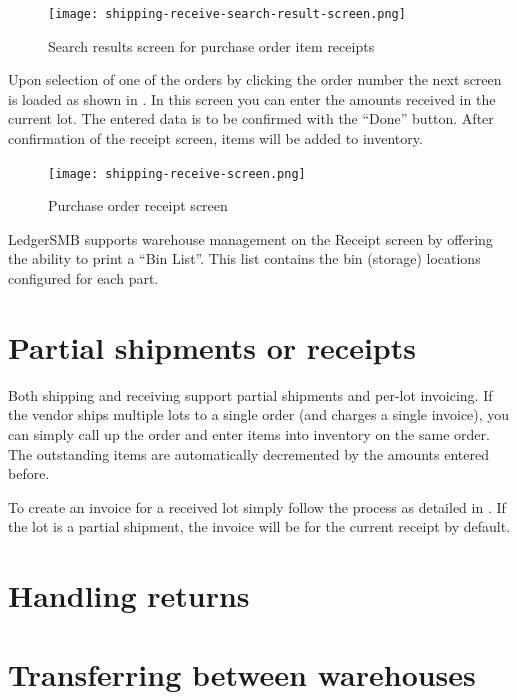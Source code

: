 \begin{figure}[h]
\centering
\texttt{[image: shipping-receive-search-result-screen.png]}
\caption{Search results screen for purchase order item receipts}
\label{fig:shipping-receive-search-result-screen}
\end{figure}

Upon selection of one of the orders by clicking the order number the next screen is loaded
as shown in . In this screen you can enter the amounts
received in the current lot. The entered data is to be confirmed with the ``Done'' button.
After confirmation of the receipt screen, items will be added to inventory.

\begin{figure}[h]
\centering
\texttt{[image: shipping-receive-screen.png]}
\caption{Purchase order receipt screen}
\label{fig:shipping-receive-screen}
\end{figure}

LedgerSMB supports warehouse management on the Receipt screen by offering the ability to
print a ``Bin List''. This list contains the bin (storage) locations configured for each part.


\section{Partial shipments or receipts}
\label{sec-business-processes-inventory-shipping-partial}

Both shipping and receiving support partial shipments and per-lot invoicing. If the vendor
ships multiple lots to a single order (and charges a single invoice), you can simply call
up the order and enter items into inventory on the same order. The outstanding items
are automatically decremented by the amounts entered before.

To create an invoice for a received lot simply follow the process as detailed in
. If the lot is a partial shipment, the invoice will be
for the current receipt by default.

\section{Handling returns}
\label{sec-business-processes-inventory-shipping-returns}


\section{Transferring between warehouses}
\label{sec-business-processes-inventory-warehouse-transfers}

